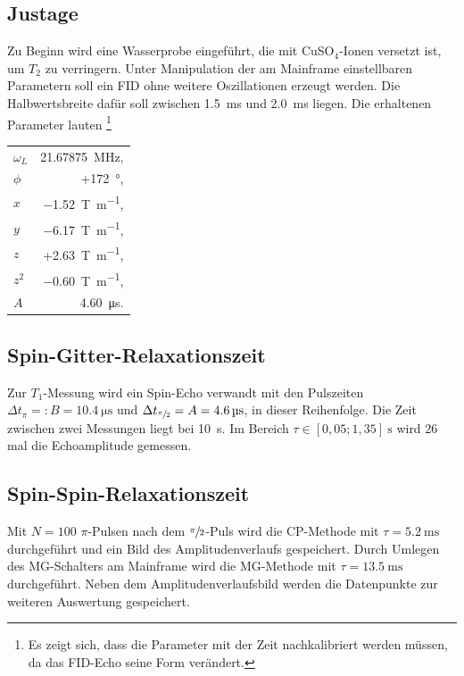 \subsection{Justage}
Zu Beginn wird eine Wasserprobe eingeführt, die mit CuSO$_4$-Ionen versetzt ist, um $T_2$ zu verringern. Unter Manipulation der am Mainframe
einstellbaren Parametern soll ein FID ohne weitere Oszillationen erzeugt werden. Die Halbwertsbreite dafür soll zwischen \SI{1,5}{\ms} und
\SI{2,0}{\ms} liegen. Die erhaltenen Parameter lauten \footnote{Es zeigt sich, dass die Parameter mit der Zeit nachkalibriert werden müssen, da
das FID-Echo seine Form verändert.}
\begin{table}[h]
\begin{tabular}{l@{=}r}
 $\omega_L$ \quad& \quad\SI{21.67875}{\MHz},\\
 $\phi$ & +\SI{172}{\degree},\\
 $x$ & \SI{-1,52}{\tesla\per \m},\\
 $y$ & \SI{-6,17}{\tesla\per \m},\\
 $z$ & +\SI{2,63}{\tesla\per \m},\\
 $z^2$ & \SI{-0,60}{\tesla\per \m},\\
 $A$ & \SI{4,60}{\micro\second}.
\end{tabular}
\end{table}

\subsection{Spin-Gitter-Relaxationszeit}
\label{sec: T1}
Zur $T_1$-Messung wird ein Spin-Echo verwandt mit den Pulszeiten $\Delta t_{\pi} =: B = \SI{10,4}{\micro\second}$
und $\Delta t_{\sfrac{\pi}{2}} = A = \SI{4,6}{\micro\second}$, in dieser Reihenfolge.
Die Zeit zwischen zwei Messungen liegt bei \SI{10}{\second}. 
Im Bereich $\tau\in[0,05; 1,35]\SI{}{\second}$ wird 26 mal die Echoamplitude gemessen.
\subsection{Spin-Spin-Relaxationszeit}
\label{sec: T2}
Mit $N=100$ $\pi$-Pulsen nach dem $\sfrac{\pi}{2}$-Puls wird die CP-Methode mit $\tau = \SI{5.2}{\milli\second}$ durchgeführt und ein 
Bild des Amplitudenverlaufs gespeichert. Durch Umlegen des MG-Schalters am Mainframe wird die MG-Methode mit $\tau = \SI{13.5}{\milli\second}$ 
durchgeführt. Neben dem Amplitudenverlaufsbild werden die Datenpunkte zur weiteren Auswertung gespeichert.

